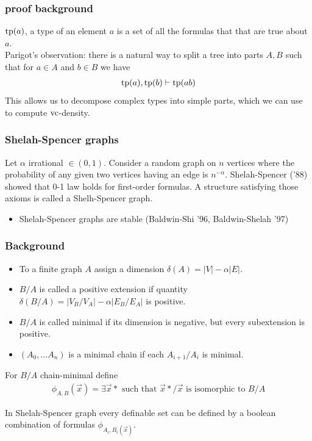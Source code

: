 \documentclass{beamer}
\begin{document}
\begin{frame}
	\frametitle{proof background}
	$\operatorname{tp}(a)$, a type of an element $a$ is a set of all the formulas that that are true about $a$.\\
	Parigot's observation: there is a natural way to split a tree into parts $A, B$ such that for $a \in A$ and $b \in B$ we have
	\begin{align*}
		\operatorname{tp}(a), \operatorname{tp}(b) \vdash \operatorname{tp}(ab)
	\end{align*}
	This allows us to decompose complex types into simple parts, which we can use to compute $\operatorname{vc}$-density.
\end{frame}

\begin{frame}
	\frametitle{Shelah-Spencer graphs}
	Let $\alpha$ irrational $\in (0,1)$. Consider a random graph on $n$ vertices where the probability of any given two vertices having an edge is $n^{-\alpha}$. Shelah-Spencer ('88) showed that 0-1 law holds for first-order formulas. A structure satisfying those axioms is called a Shelh-Spencer graph.
	\begin{itemize}
		\item Shelah-Spencer graphs are stable (Baldwin-Shi '96, Baldwin-Shelah '97)
	\end{itemize}
\end{frame}

\begin{frame}
	\frametitle{Background}
\begin{Definition}
	\begin{itemize}
		\item To a finite graph $A$ assign a dimension $\delta(A) = |V| - \alpha |E|$.
		\item $B/A$ is called a positive extension if quantity $\delta(B/A) = |V_B/V_A| - \alpha |E_B/E_A|$ is positive.
		\item $B/A$ is called minimal if its dimension is negative, but every subextension is positive.
		\item $(A_0, \ldots A_n)$ is a minimal chain if each $A_{i + 1}/A_i$ is minimal.
	\end{itemize}
\end{Definition}
	For $B/A$ chain-minimal define
	\begin{align*}
		\phi_{A,B}(\vec x) = \exists \vec x* \text { such that $\vec x*/\vec x$ is isomorphic to $B/A$}
	\end{align*}
	\begin{Theorem} 
		In Shelah-Spencer graph every definable set can be defined by a boolean combination of formulas $\phi_{A_i, B_i(\vec x)}$.
	\end{Theorem}
\end{frame}
\end{document}
